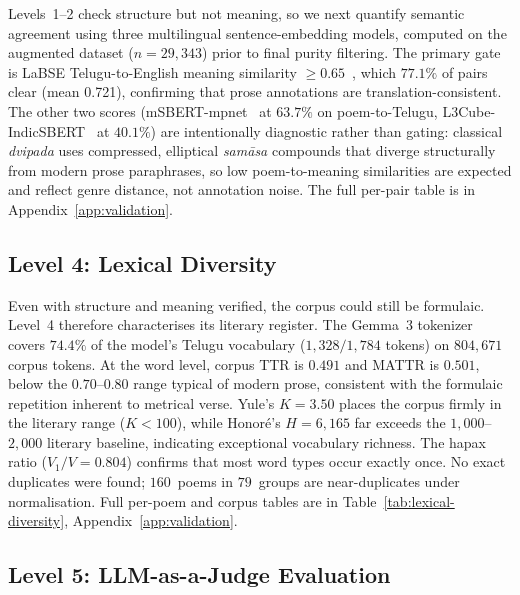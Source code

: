 \documentclass[11pt]{article}
\begin{document}
Levels~1--2 check structure but not meaning, so we next quantify
semantic agreement using three multilingual sentence-embedding models,
computed on the augmented dataset ($n=29{,}343$) prior to final purity
filtering. The primary gate is LaBSE Telugu-to-English meaning
similarity $\geq 0.65$~\citep{feng2022languageagnostic}, which $77.1\%$
of pairs clear (mean 0.721), confirming that prose annotations are
translation-consistent. The other two scores
(mSBERT-mpnet~\citep{reimers2020multilingual} at $63.7\%$ on
poem-to-Telugu, L3Cube-IndicSBERT~\citep{deode2023l3cubeindicsbertsimpleapproachlearning}
at $40.1\%$) are intentionally diagnostic rather than gating: classical
\textit{dvipada} uses compressed, elliptical \textit{sam\={a}sa}
compounds that diverge structurally from modern prose paraphrases, so
low poem-to-meaning similarities are expected and reflect genre
distance, not annotation noise. The full per-pair table is in
Appendix~\ref{app:validation}.

\subsection{Level 4: Lexical Diversity}

Even with structure and meaning verified, the corpus could still be
formulaic. Level~4 therefore characterises its literary register. The
Gemma~3 tokenizer covers $74.4\%$ of the model's Telugu vocabulary
($1{,}328/1{,}784$ tokens) on $804{,}671$ corpus tokens. At the word
level, corpus TTR is $0.491$ and MATTR is $0.501$, below the
$0.70$--$0.80$ range typical of modern prose, consistent with the
formulaic repetition inherent to metrical verse. Yule's $K=3.50$ places
the corpus firmly in the literary range ($K<100$), while Honoré's
$H=6{,}165$ far exceeds the $1{,}000$--$2{,}000$ literary baseline,
indicating exceptional vocabulary richness. The hapax ratio
($V_1/V=0.804$) confirms that most word types occur exactly once. No
exact duplicates were found; $160$~poems in $79$~groups are
near-duplicates under normalisation. Full per-poem and corpus tables
are in Table~\ref{tab:lexical-diversity}, Appendix~\ref{app:validation}.

\subsection{Level 5: LLM-as-a-Judge Evaluation}
\end{document}
